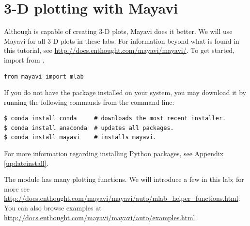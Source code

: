 \section*{3-D plotting with Mayavi}

Although  is capable of creating 3-D plots, Mayavi does it better.
We will use Mayavi for all 3-D plots in these labs.
For information beyond what is found in this tutorial, see \url{http://docs.enthought.com/mayavi/mayavi/}.
To get started, import  from .
\begin{lstlisting}
from mayavi import mlab
\end{lstlisting}

\begin{info}
If you do not have the  package installed on your system, you may download it by running the following commands from the command line:
\begin{lstlisting}
$ conda install conda     # downloads the most recent installer.
$ conda install anaconda  # updates all packages.
$ conda install mayavi    # installs mayavi.
\end{lstlisting}

For more information regarding installing Python packages, see Appendix \ref{updateinstall}.
\end{info}

The module  has many plotting functions.
We will introduce a few in this lab; for more see \url{http://docs.enthought.com/mayavi/mayavi/auto/mlab_helper_functions.html}.
You can also browse examples at \url{http://docs.enthought.com/mayavi/mayavi/auto/examples.html}.

